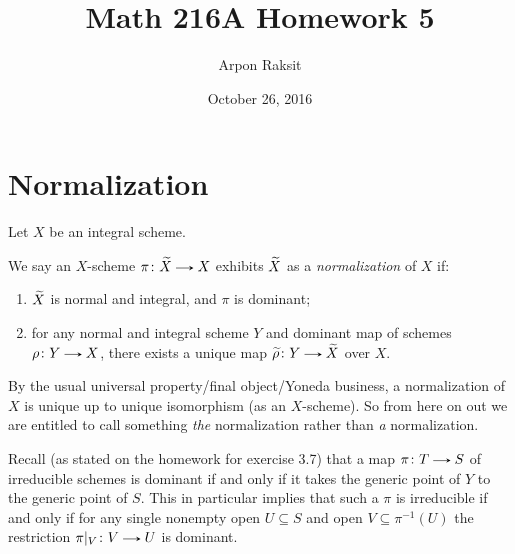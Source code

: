 

\title{Math 216A Homework 5}
\author{Arpon Raksit}
\date{October 26, 2016}




\maketitle


\section{Normalization}

Let $X$ be an integral scheme.

\begin{definition}
  \label{normalization}
  We say an $X$-scheme $\pi \c \til{X} \to X$ exhibits $\widetilde{X}$ as a \emph{normalization} of $X$ if:
  \begin{enumerate}
  \item $\widetilde{X}$ is normal and integral, and $\pi$ is dominant;
  \item for any normal and integral scheme $Y$ and dominant map of schemes $\rho \c Y \to X$, there exists a unique map $\til{\rho} \c Y \to \til{X}$ over $X$.
  \end{enumerate}
\end{definition}

\begin{remark}
  \label{normalization-unique}
   By the usual universal property/final object/Yoneda business, a normalization of $X$ is unique up to unique isomorphism (as an $X$-scheme). So from here on out we are entitled to call something \emph{the} normalization rather than \emph{a} normalization.
\end{remark}

\begin{remark}
  \label{irreducible-dominant-generic}
  Recall (as stated on the homework for exercise 3.7) that a map $\pi \c T \to S$ of irreducible schemes is dominant if and only if it takes the generic point of $Y$ to the generic point of $S$. This in particular implies that such a $\pi$ is irreducible if and only if for any single nonempty open $U \subseteq S$ and open $V \subseteq \pi^{-1}(U)$ the restriction $\pi|_V \c V \to U$ is dominant.
\end{remark}


